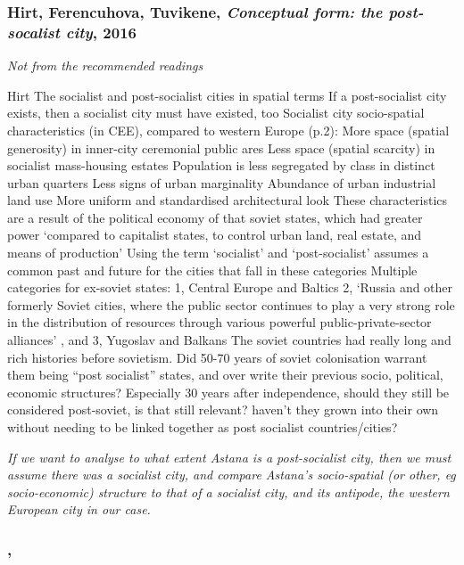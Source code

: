 \documentclass{article}
\begin{document}
\subsubsection{Hirt, Ferencuhova, Tuvikene, \textit{Conceptual form: the post-socalist city}, 2016}\cite{hirt2016conceptual}
\textit{Not from the recommended readings}

\begin{outline}
	\1 Hirt
		\2 The socialist and post-socialist cities in spatial terms
		\2 If a post-socialist city exists, then a socialist city must have existed, too
		\2 Socialist city socio-spatial characteristics (in CEE), compared to western Europe (p.2):
			\3 More space (spatial generosity) in inner-city ceremonial public ares
			\3 Less space (spatial scarcity) in socialist mass-housing estates
			\3 Population is less segregated by class in distinct urban quarters
			\3 Less signs of urban marginality
			\3 Abundance of urban industrial land use
			\3 More uniform and standardised architectural look
		\2 These characteristics are a result of the political economy of that soviet states, which had greater power `compared to capitalist states, to control urban land, real estate, and means of production'
		\2 Using the term `socialist' and `post-socialist' assumes a common past and future for the cities that fall in these categories
		\2 Multiple categories for ex-soviet states: 1, Central Europe and Baltics 2, `Russia and other formerly Soviet cities, where the public sector continues to play a very strong role in the distribution of resources through various powerful public-private-sector alliances' , and 3, Yugoslav and Balkans 
		\2 The soviet countries had really long and rich histories before sovietism. Did 50-70 years of soviet colonisation warrant them being ``post socialist'' states, and over write their previous socio, political, economic structures? Especially 30 years after independence, should they still be considered post-soviet, is that still relevant? haven't they grown into their own without needing to be linked together as post socialist countries/cities?
		\2
\end{outline}

\textit{If we want to analyse to what extent Astana is a post-socialist city, then we must assume there was a socialist city, and compare Astana's socio-spatial (or other, eg socio-economic) structure to that of a socialist city, and its antipode, the western European city in our case.}




\subsubsection{, \textit{}}

\begin{outline}
	\1
\end{outline}


\fi
\end{document}
